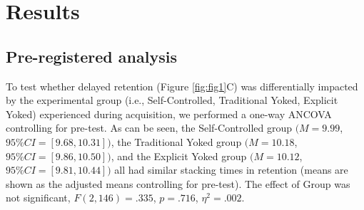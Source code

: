\documentclass[
  english,
  man,floatsintext]{apa7}
\begin{document}
\hypertarget{results}{%
\section{Results}\label{results}}

\hypertarget{pre-registered-analysis}{%
\subsection{Pre-registered analysis}\label{pre-registered-analysis}}

To test whether delayed retention (Figure \ref{fig:fig1}C) was differentially impacted by the experimental group (i.e., Self-Controlled, Traditional Yoked, Explicit Yoked) experienced during acquisition, we performed a one-way ANCOVA controlling for pre-test. As can be seen, the Self-Controlled group \((M = 9.99\), \(95\%CI = [9.68,10.31])\), the Traditional Yoked group \((M = 10.18\), \(95\%CI = [9.86,10.50])\), and the Explicit Yoked group \((M = 10.12\), \(95\%CI = [9.81,10.44])\) all had similar stacking times in retention (means are shown as the adjusted means controlling for pre-test). The effect of Group was not significant, \(F(2,146) = .335\), \(p = .716\), \(\eta^2 = .002\).
\end{document}
